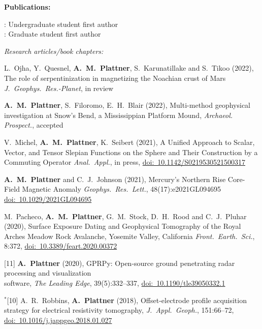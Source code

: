 \documentclass[10pt]{article}
\begin{document}
\spc
\textbf{\tsize Publications:}

\spcp
\ug: Undergraduate student first author\\
\gr: Graduate student first author


\spcp
\emph{Research articles/book chapters:}

\spcp
L.~Ojha, Y.~Quesnel, \textbf{A.~M.~Plattner}, S.~Karunatillake and S.~Tikoo (2022),
The role of serpentinization in magnetizing the Noachian crust of Mars
\emph{J.~Geophys.~Res.-Planet}, in review

\spcp
\shift[15] \textbf{A.~M.~Plattner}, S.~Filoromo, E.~H.~Blair (2022), Multi-method geophysical
investigation at Snow's Bend, a Mississippian Platform Mound,
\emph{Archaeol. Prospect.}, accepted

\spcp
\shift[14] V.~Michel, \textbf{A.~M.~Plattner}, K.~Seibert (2021),
A Unified Approach to Scalar, Vector, and Tensor Slepian Functions on the Sphere and Their Construction by a Commuting Operator
\emph{Anal.~Appl.}, in press, \href{https://doi.org/10.1142/S0219530521500317}{doi:~10.1142/S0219530521500317}

\spcp
\shift[13] \textbf{A.~M.~Plattner} and C.~J.~Johnson (2021),
Mercury's Northern Rise Core-Field Magnetic Anomaly
\emph{Geophys.~Res.~Lett.}, 48(17):e2021GL094695 \href{https://doi.org/10.1029/2021GL094695}{doi:~10.1029/2021GL094695}

\newpage
\grshift \gr[12] M.~Pacheco, \textbf{A.~M.~Plattner}, G.~M.~Stock, D.~H.~Rood and C.~J.~Pluhar (2020),
Surface Exposure Dating and Geophysical Tomography of the Royal Arches Meadow Rock Avalanche, Yosemite Valley, California
\emph{Front.~Earth.~Sci.}, 8:372, \href{https://www.frontiersin.org/articles/10.3389/feart.2020.00372/full}{doi:~10.3389/feart.2020.00372} 

\spcp
\hspace{-0.675cm}[11] \textbf{A.~Plattner} (2020), GPRPy: Open-source ground penetrating radar processing and visualization \\software, \emph{The Leading Edge}, 39(5):332--337, \href{https://doi.org/10.1190/tle39050332.1}{doi:~10.1190/tle39050332.1}

\spcp
\hspace{-0.835cm}$^*$[10] A.~R.~Robbins, \textbf{A.~Plattner} (2018),
Offset-electrode profile acquisition strategy for
electrical resistivity tomography,
\emph{J.~Appl.~Geoph.}, 151:66--72, \href{https://www.sciencedirect.com/science/article/pii/S0926985117308376?via%3Dihub}{doi:~10.1016/j.jappgeo.2018.01.027} 
\end{document}
